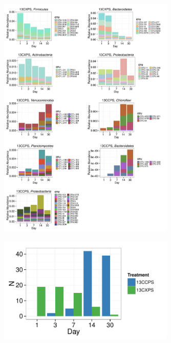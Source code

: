 \begin{figure}[H]
	\begin{center}
    \centerline{\includegraphics[width=0.75\textwidth]{figures/bulk_phylum_rspndr_abund/abund_v_time_phyla.pdf}}
	\caption{\protect}\label{fig:babund}
        \end{center}
\end{figure}

\begin{figure}[H]
	\begin{center}
	\centerline{\includegraphics[width=0.75\textwidth]{figures/all_rspndr_bar/all_rspndr_bar.pdf}}
	\caption{\protect}\label{fig:rspndr_count}
        \end{center}
\end{figure}


